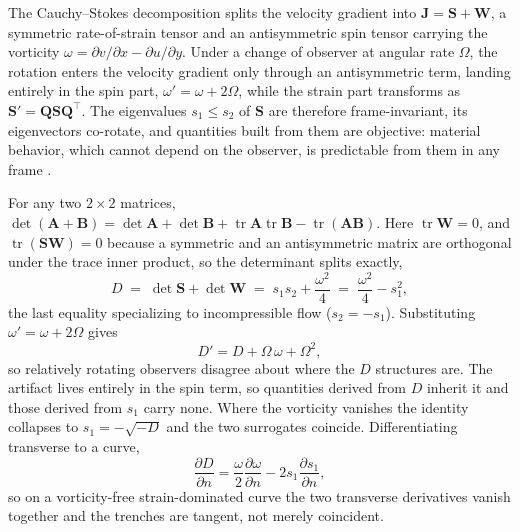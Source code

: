 \documentclass[lettersize,journal]{IEEEtran}
\begin{document}
The Cauchy--Stokes decomposition splits the velocity gradient into
$\mathbf{J} = \mathbf{S} + \mathbf{W}$, a symmetric rate-of-strain
tensor and an antisymmetric spin tensor carrying the vorticity $\omega
= \partial v/\partial x - \partial u/\partial y$. Under a change of
observer at angular rate $\Omega$, the rotation enters the
velocity gradient only through an antisymmetric term, landing
entirely in the spin part, $\omega' = \omega + 2\Omega$, while the
strain part transforms as $\mathbf{S}' = \mathbf{Q}\mathbf{S}
\mathbf{Q}^\top$. The eigenvalues $s_1 \leq s_2$ of $\mathbf{S}$ are
therefore frame-invariant, its eigenvectors co-rotate, and quantities
built from them are objective: material behavior, which cannot depend
on the observer, is predictable from them in any frame \cite{16,17}.

For any two $2 \times 2$ matrices,
$\det(\mathbf{A}+\mathbf{B}) = \det\mathbf{A} + \det\mathbf{B} +
\operatorname{tr}\mathbf{A}\operatorname{tr}\mathbf{B} -
\operatorname{tr}(\mathbf{A}\mathbf{B})$. Here $\operatorname{tr}
\mathbf{W} = 0$, and $\operatorname{tr}(\mathbf{S}\mathbf{W}) = 0$
because a symmetric and an antisymmetric matrix are orthogonal under
the trace inner product, so the determinant splits exactly,
\begin{equation}
    D \;=\; \det\mathbf{S} + \det\mathbf{W}
      \;=\; s_1 s_2 + \frac{\omega^2}{4}
      \;=\; \frac{\omega^2}{4} - s_1^2,
    \label{eq:splitting}
\end{equation}
the last equality specializing to incompressible flow ($s_2 = -s_1$).
Substituting $\omega' = \omega + 2\Omega$ gives
\begin{equation}
    D' = D + \Omega\,\omega + \Omega^2 ,
    \label{eq:D_not_objective}
\end{equation}
so relatively rotating observers disagree about where the $D$ structures
are. The artifact lives entirely in the spin term,
so quantities derived from $D$ inherit it and those
derived from $s_1$ carry none. Where the vorticity vanishes the
identity collapses to $s_1 = -\sqrt{-D}$ and the two surrogates
coincide. Differentiating transverse to a curve,
\begin{equation}
    \frac{\partial D}{\partial n} =
    \frac{\omega}{2}\frac{\partial \omega}{\partial n}
    - 2 s_1 \frac{\partial s_1}{\partial n},
    \label{eq:trench_coincide}
\end{equation}
so on a vorticity-free strain-dominated curve the two transverse
derivatives vanish together and the trenches are tangent, not merely
coincident.
\end{document}
